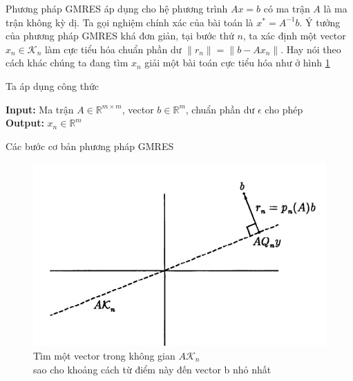 \documentclass[14pt, a4paper]{article}
\numberwithin{equation}{section}
\numberwithin{algorithm}{section}
\numberwithin{figure}{section}
\numberwithin{dl}{section}
\numberwithin{md}{section}
\numberwithin{bd}{section}
\numberwithin{dn}{section}
\numberwithin{hq}{section}
\begin{document}
Phương pháp GMRES áp dụng cho hệ phương trình $Ax=b$ có ma trận $A$ là ma trận không kỳ dị. Ta gọi nghiệm chính xác của bài toán là $x^* = A^{-1}b$. Ý tưởng của phương pháp GMRES khá đơn giản, tại bước thứ $n$, ta xác định một vector $x_n \in \mathcal{K}_n$ làm cực tiểu hóa chuẩn phần dư $\lVert r_n \rVert = \lVert b - A x_n \rVert$. Hay nói theo cách khác chúng ta đang tìm $x_n$ giải một bài toán cực tiểu hóa như ở hình \ref{fig:GMRES-LS}



Ta áp dụng công thức
\begin{algorithm}[h!]
    \hspace*{\algorithmicindent} \textbf{Input:} {Ma trận $A \in \mathbb{R}^{m \times m}$, vector $b \in \mathbb{R}^m$, chuẩn phần dư $\epsilon$ cho phép} \\
    \hspace*{\algorithmicindent} \textbf{Output:} {$x_n \in \mathbb{R}^m$}
    \caption{Các bước cơ bản phương pháp GMRES}\label{alg:GMRES}
    \begin{algorithmic}
        \EndFor
    \end{algorithmic}
\end{algorithm}

\begin{figure}[h!] \centering

    \includegraphics[scale=0.8]{GMRES-LS.jpg}
    \caption{Tìm một vector trong không gian $A \mathcal{K}_n$ \\ sao cho khoảng cách từ điểm này đến vector b nhỏ nhất}

    \label{fig:GMRES-LS}
\end{figure}
\end{document}

